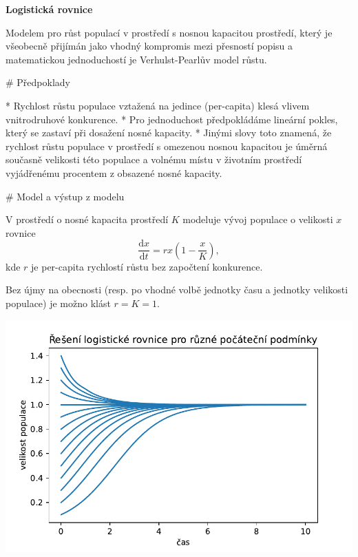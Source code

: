 \documentclass{article}
\begin{document}
\begin{center}
  \Large \bfseries
Logistická rovnice
\end{center}
\pagestyle{empty}


\begin{markdown}

Modelem pro růst populací v prostředí s nosnou kapacitou prostředí, který je
všeobecně přijímán jako vhodný kompromis mezi přesností popisu a matematickou
jednoduchostí je Verhulst-Pearlův model růstu.

# Předpoklady

* Rychlost růstu populace vztažená na jedince (per-capita) klesá vlivem vnitrodruhové konkurence.
* Pro jednoduchost předpokládáme lineární pokles, který se zastaví při dosažení nosné kapacity.
* Jinými slovy toto znamená, že rychlost růstu populace v prostředí s omezenou nosnou kapacitou je úměrná současně 
velikosti této populace a volnému místu v životním prostředí vyjádřenému procentem z obsazené nosné kapacity.


# Model a výstup z modelu


\end{markdown}

\begin{minipage}[t]{0.5\linewidth}
V prostředí o nosné kapacita prostředí $K$ modeluje vývoj populace o
velikosti $x$ rovnice
$$\frac{\mathrm dx}{\mathrm dt}=rx\left(1-\frac xK\right),$$ kde $r$
je per-capita rychlostí růstu bez započtení konkurence.

Bez újmy na obecnosti (resp. po vhodné volbě jednotky času a jednotky
velikosti populace) je možno klást $r=K=1$.


\end{minipage}\begin{minipage}[t]{0.5\linewidth}
  \vspace*{-20pt}
  \includegraphics[width=\linewidth]{logisticka.pdf}
\end{minipage}
\end{document}
